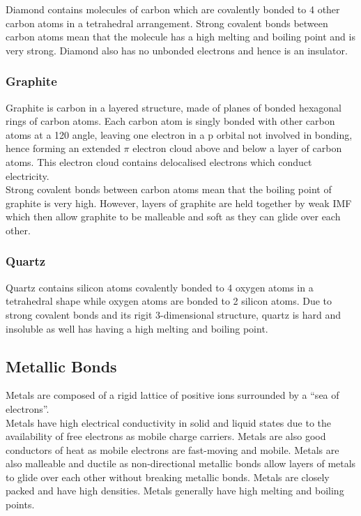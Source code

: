 \documentclass[../main]{subfiles}
\begin{document}
	Diamond contains molecules of carbon which are covalently bonded to 4 other carbon atoms in a tetrahedral arrangement. Strong  covalent bonds between carbon atoms mean that the molecule has a high melting and boiling point and is very strong. Diamond also has no unbonded electrons and hence is an insulator.

	\subsubsection{Graphite}

	Graphite is carbon in a layered structure, made of planes of bonded hexagonal rings of carbon atoms. Each carbon atom is singly bonded with other carbon atoms at a 120 \degree angle, leaving one electron in a p orbital not involved in bonding, hence forming an extended \(\pi\) electron cloud above and below a layer of carbon atoms. This electron cloud contains delocalised electrons which conduct electricity. \\

	Strong covalent bonds between carbon atoms mean that the boiling point of graphite is very high. However, layers of graphite are held together by weak IMF which then allow graphite to be malleable and soft as they can glide over each other.

	\subsubsection{Quartz}

	Quartz  contains silicon atoms covalently bonded to 4 oxygen atoms in a tetrahedral shape while oxygen atoms are bonded to 2 silicon atoms. Due to strong covalent bonds and its rigit 3-dimensional structure, quartz is hard and insoluble as well has having a high melting and boiling point.

	\subsection{Metallic Bonds}

	Metals are composed of a rigid lattice of positive ions surrounded by a ``sea of electrons''. \\

	Metals have high electrical conductivity in solid and liquid states due to the availability of free electrons as mobile charge carriers. Metals are also good conductors of heat as mobile electrons are fast-moving and mobile. Metals are also malleable and ductile as non-directional metallic bonds allow layers of metals to glide over each other without breaking metallic bonds. Metals are closely packed and have high densities. Metals generally have high melting and boiling points.
\end{document}
